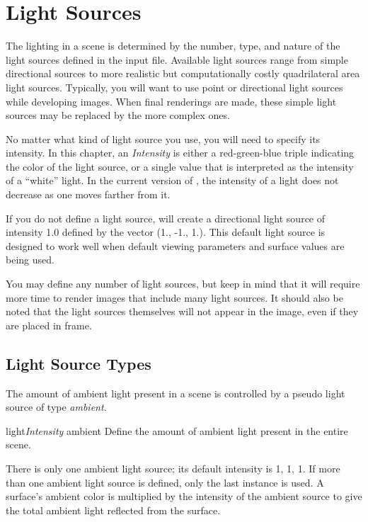 \chapter{Light Sources}

The lighting in a scene is determined by the number, type, and nature
of the light sources defined in the input file.  Available light sources
range from simple directional sources to more realistic but computationally
costly quadrilateral area light sources.  Typically, you will want to use
point or directional light sources while developing images.  When
final renderings are made, these simple light sources may be replaced by
the more complex ones.

No matter what kind of light source you use, you will need to
specify its intensity.
In this chapter, an {\em Intensity\/} is either a red-green-blue triple
indicating the color of the light source, or a single value that is
interpreted as the intensity of a ``white'' light.
In the current version of {\rayshade}, the intensity of a light does
not decrease as
one moves farther from it.

If you do not define a light source, {\rayshade} will create a directional
light source of intensity 1.0 defined by the vector (1., -1., 1.).
This default light source is designed to work well when default
viewing parameters and surface values are being used.

You may define any number of light sources, but keep in mind that
it will require more time to render images that include many
light sources.  It should also be noted that the light sources themselves
will not appear in the image, even if they are placed in frame.

\section{Light Source Types}

The amount of ambient light present in a scene is controlled by a
pseudo light source of type {\em ambient}.

\begin{defkey}{light}{{\em Intensity\/} ambient}
	Define the amount of ambient light present in the entire
	scene.
\end{defkey}

There is only one ambient light source; its default intensity is
{1, 1, 1}.  If more than one ambient light source is defined,
only the last instance is used.  A surface's ambient color
is multiplied by the intensity of the ambient source to give the
total ambient light reflected from the surface.

